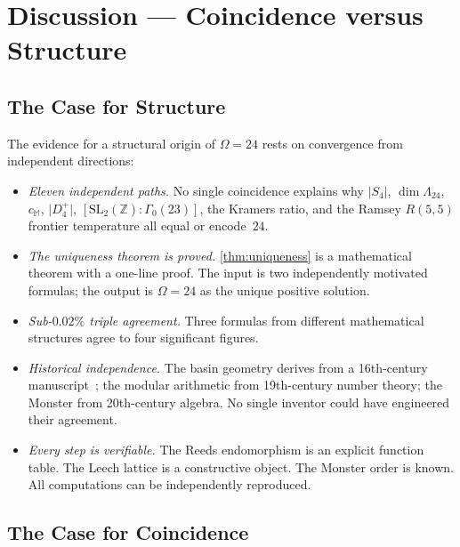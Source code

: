 \documentclass[11pt,a4paper]{article}
\theoremstyle{plain}
\theoremstyle{remark}
\renewcommand{\Omega}{\varOmega}
\newcommand{\Z}{\mathbb{Z}}
\newcommand{\abs}[1]{\lvert #1 \rvert}
\newcommand{\SL}{\mathrm{SL}}
\begin{document}
\section{Discussion --- Coincidence versus Structure}
\label{sec:discussion}

\subsection{The Case for Structure}
\label{sec:disc-structure}

The evidence for a structural origin of $\Omega=24$ rests on convergence
from independent directions:

\begin{itemize}[itemsep=4pt]
\item \emph{Eleven independent paths.}  No single coincidence explains why
  $\abs{S_4}$, $\dim\Lambda_{24}$, $c_{\mathbb{M}}$, $\abs{D_4^+}$,
  $[\SL_2(\Z):\Gamma_0(23)]$, the Kramers ratio, and the Ramsey $R(5,5)$
  frontier temperature all equal or encode~$24$.

\item \emph{The uniqueness theorem is proved.}  \cref{thm:uniqueness} is
  a mathematical theorem with a one-line proof.  The input is two
  independently motivated formulas; the output is $\Omega=24$ as the
  unique positive solution.

\item \emph{Sub-$0.02\%$ triple agreement.}  Three formulas from different
  mathematical structures agree to four significant figures.

\item \emph{Historical independence.}  The basin geometry derives from a
  16th-century manuscript~\cite{reeds2006}; the modular arithmetic from
  19th-century number theory; the Monster from 20th-century algebra.
  No single inventor could have engineered their agreement.

\item \emph{Every step is verifiable.}  The Reeds endomorphism is an
  explicit function table.  The Leech lattice is a constructive object.
  The Monster order is known.  All computations can be independently
  reproduced.
\end{itemize}

\subsection{The Case for Coincidence}
\label{sec:disc-coincidence}
\end{document}
